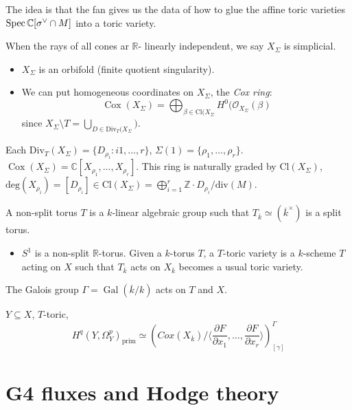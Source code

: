 The idea is that the fan gives us the data
of how to glue the affine toric varieties
$\mathop{\mathrm{Spec}} \mathbb{C}[\sigma^\vee \cap M]$
into a toric variety.

When the rays of all cones ar $\mathbb{R}$-
linearly independent, we say
$X_{\Sigma}$ is simplicial.
\begin{itemize}
\item $X_\Sigma$ is an orbifold
(finite quotient singularity).
\item We can put homogeneous coordinates
on $X_{\Sigma}$, the {\it Cox ring}:
$$
\operatorname{Cox}(X_{\Sigma})
= \bigoplus_{\beta \in \text{Cl}(X_{\Sigma}}
H^0(\mathcal{O}_{X_{\Sigma}}(\beta)
$$
since $X_{\Sigma}\setminus T
= \bigcup_{D \in
\text{Div}_{T}(X_{\Sigma}})$.
\end{itemize}

\noindent
Each $\text{Div}_T(X_{\Sigma})
=\{D_{\rho_i}:i 1,…,r\}$,
$\Sigma(1)= \{\rho_1,…,\rho_r\}$.
$\operatorname{Cox}(X_{\Sigma})
=\mathbb{C}[X_{\rho_1},…,X_{\rho_r}]$.
This ring is naturally graded by
$\text{Cl}(X_{\Sigma})$,
$\text{deg}(X_{\rho_i})=
[D_{\rho_i}] \in \text{Cl}(X_{\Sigma})
=\bigoplus_{i=1}^r \mathbb{Z}\cdot
D_{\rho_i}/\text{div}(M)$.

A non-split torus $T$ is a $k$-linear
algebraic group such that
$T_{\overline{k}}\simeq
(\overline{k}^\times)$ is a split torus.

\begin{itemize}
\item $S^1$ is a non-split
$\mathbb{R}$-torus.
Given a $k$-torus $T$, a $T$-toric
variety is a $k$-scheme $T$ acting on $X$
such that $T_{\overline{k}}$ acts on
$X_{\overline{k}}$ becomes a usual
toric variety.
\end{itemize}

\noindent
The Galois group $\Gamma=\operatorname{Gal}
(\overline{k}/k)$ acts on $T$ and $X$.

\begin{theorem}
\label{theorem-toric-primitive-hodge}
$Y \subseteq X$, $T$-toric,
$$
H^q(Y,\Omega_Y^p)_{\operatorname{prim}}
\simeq
(Cox(X_{\overline{k}})
/\langle \frac{\partial F}{\partial x_1}
,…,\frac{\partial F}{\partial x_r}\rangle)
^\Gamma_{[\gamma]}
$$
\end{theorem}

\section{G4 fluxes and Hodge theory}
\label{section-g4-fluxes-and-hodge-theory}

